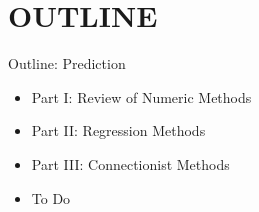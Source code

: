 \documentclass[handout]{beamer}
\begin{document}
\section*{OUTLINE}
\begin{frame}{Outline: Prediction}
\begin{itemize}
\item Part I: Review of Numeric Methods
\item Part II: Regression Methods
\item Part III: Connectionist Methods
\vspace*{0.3cm}
\item To Do
\end{itemize}
\end{frame}


\end{document}
